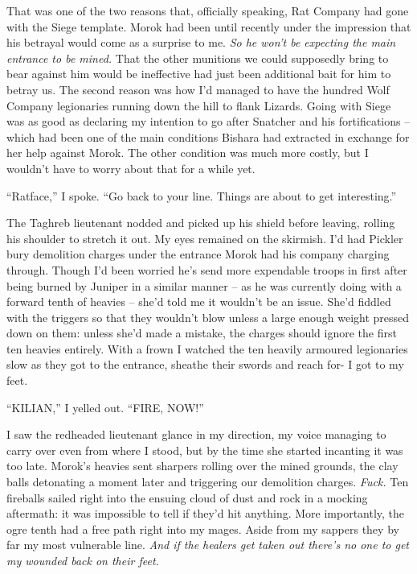 \documentclass[12pt, openany]{book}
\begin{document}
That was one of the two reasons that, officially speaking, Rat Company had gone with the Siege template. Morok had been until recently under the impression that his betrayal would come as a surprise to me. \textit{So he won’t be expecting the main entrance to be mined.} That the other munitions we could supposedly bring to bear against him would be ineffective had just been additional bait for him to betray us. The second reason was how I’d managed to have the hundred Wolf Company legionaries running down the hill to flank Lizards. Going with Siege was as good as declaring my intention to go after Snatcher and his fortifications – which had been one of the main conditions Bishara had extracted in exchange for her help against Morok. The other condition was much more costly, but I wouldn’t have to worry about that for a while yet.

“Ratface,” I spoke. “Go back to your line. Things are about to get interesting.”

The Taghreb lieutenant nodded and picked up his shield before leaving, rolling his shoulder to stretch it out. My eyes remained on the skirmish. I’d had Pickler bury demolition charges under the entrance Morok had his company charging through. Though I’d been worried he’s send more expendable troops in first after being burned by Juniper in a similar manner – as he was currently doing with a forward tenth of heavies – she’d told me it wouldn’t be an issue. She’d fiddled with the triggers so that they wouldn’t blow unless a large enough weight pressed down on them: unless she’d made a mistake, the charges should ignore the first ten heavies entirely. With a frown I watched the ten heavily armoured legionaries slow as they got to the entrance, sheathe their swords and reach for- I got to my feet.

“KILIAN,” I yelled out. “FIRE, NOW!”

I saw the redheaded lieutenant glance in my direction, my voice managing to carry over even from where I stood, but by the time she started incanting it was too late. Morok’s heavies sent sharpers rolling over the mined grounds, the clay balls detonating a moment later and triggering our demolition charges. \textit{Fuck.} Ten fireballs sailed right into the ensuing cloud of dust and rock in a mocking aftermath: it was impossible to tell if they’d hit anything. More importantly, the ogre tenth had a free path right into my mages. Aside from my sappers they by far my most vulnerable line. \textit{And if the healers get taken out there’s no one to get my wounded back on their feet.}
\end{document}
